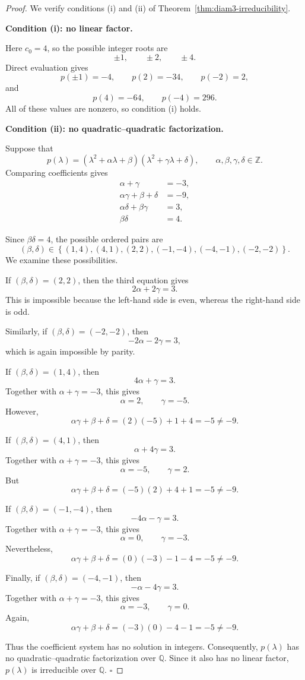 \documentclass[11pt]{amsart}
\begin{document}
\begin{proof}
We verify conditions \textup{(i)} and \textup{(ii)} of
Theorem~\ref{thm:diam3-irreducibility}.

\medskip
\noindent\textbf{Condition \textup{(i): no linear factor.}}

Here \(c_0=4\), so the possible integer roots are
\[
\pm1,\qquad \pm2,\qquad \pm4.
\]
Direct evaluation gives
\[
p(\pm1)=-4,\qquad p(2)=-34,\qquad p(-2)=2,
\]
and
\[
p(4)=-64,\qquad p(-4)=296.
\]
All of these values are nonzero, so condition \textup{(i)} holds.

\medskip
\noindent\textbf{Condition \textup{(ii): no quadratic--quadratic factorization.}}

Suppose that
\[
p(\lambda)
=
(\lambda^2+\alpha\lambda+\beta)
(\lambda^2+\gamma\lambda+\delta),
\qquad
\alpha,\beta,\gamma,\delta\in\mathbb Z.
\]
Comparing coefficients gives
\[
\begin{aligned}
\alpha+\gamma&=-3,\\
\alpha\gamma+\beta+\delta&=-9,\\
\alpha\delta+\beta\gamma&=3,\\
\beta\delta&=4.
\end{aligned}
\]

Since \(\beta\delta=4\), the possible ordered pairs are
\[
(\beta,\delta)\in
\left\{
(1,4),(4,1),(2,2),
(-1,-4),(-4,-1),(-2,-2)
\right\}.
\]
We examine these possibilities.

If \((\beta,\delta)=(2,2)\), then the third equation gives
\[
2\alpha+2\gamma=3.
\]
This is impossible because the left-hand side is even, whereas the right-hand side is odd.

Similarly, if \((\beta,\delta)=(-2,-2)\), then
\[
-2\alpha-2\gamma=3,
\]
which is again impossible by parity.

If \((\beta,\delta)=(1,4)\), then
\[
4\alpha+\gamma=3.
\]
Together with \(\alpha+\gamma=-3\), this gives
\[
\alpha=2,\qquad \gamma=-5.
\]
However,
\[
\alpha\gamma+\beta+\delta
=
(2)(-5)+1+4
=
-5
\neq
-9.
\]

If \((\beta,\delta)=(4,1)\), then
\[
\alpha+4\gamma=3.
\]
Together with \(\alpha+\gamma=-3\), this gives
\[
\alpha=-5,\qquad \gamma=2.
\]
But
\[
\alpha\gamma+\beta+\delta
=
(-5)(2)+4+1
=
-5
\neq
-9.
\]

If \((\beta,\delta)=(-1,-4)\), then
\[
-4\alpha-\gamma=3.
\]
Together with \(\alpha+\gamma=-3\), this gives
\[
\alpha=0,\qquad \gamma=-3.
\]
Nevertheless,
\[
\alpha\gamma+\beta+\delta
=
(0)(-3)-1-4
=
-5
\neq
-9.
\]

Finally, if \((\beta,\delta)=(-4,-1)\), then
\[
-\alpha-4\gamma=3.
\]
Together with \(\alpha+\gamma=-3\), this gives
\[
\alpha=-3,\qquad \gamma=0.
\]
Again,
\[
\alpha\gamma+\beta+\delta
=
(-3)(0)-4-1
=
-5
\neq
-9.
\]

Thus the coefficient system has no solution in integers. Consequently, \(p(\lambda)\) has no quadratic--quadratic factorization over \(\mathbb Q\). Since it also has no linear factor, \(p(\lambda)\) is irreducible over \(\mathbb Q\). \hfill $\square$
\end{proof}
\end{document}
